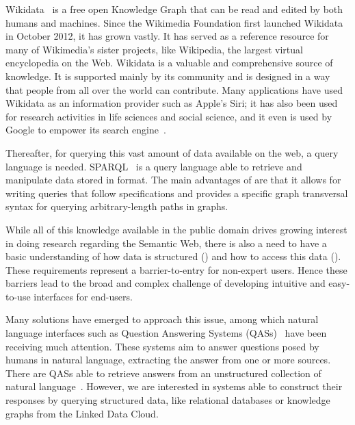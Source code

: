 Wikidata~\cite{KG:wikidata} is a free open Knowledge Graph that can be read and edited by both humans 
and machines. Since the Wikimedia Foundation first launched Wikidata in October 2012, it has grown 
vastly. It has served as a reference resource for many of Wikimedia’s sister 
projects, like Wikipedia, the largest virtual encyclopedia on the Web. Wikidata is a valuable 
and comprehensive source of knowledge. It is supported mainly by its community and is 
designed in a way that people from all over the world can contribute. Many applications have 
used Wikidata as an information provider such as Apple’s Siri; it has also been used for research 
activities in life sciences and social science, and it even is used by Google to empower its search 
engine~\cite{wikidata:usage-MalyshevKGGB18}.

Thereafter, for querying this vast amount of data available on the web, a query language is needed. 
SPARQL~\cite{key:sparql11} is a query language able to retrieve and manipulate data stored in \RDF{} 
format. The main advantages of \SPARQL{} are that it allows for writing queries that follow \RDF{} 
specifications and provides a specific graph transversal syntax for querying arbitrary-length paths 
in graphs.

While all of this knowledge available in the public domain drives growing interest in doing 
research regarding the Semantic Web, there is also a need to have a basic understanding of 
how data is structured (\RDF) and how to access this data (\SPARQL). These requirements 
represent a barrier-to-entry for non-expert users. Hence these barriers lead to the broad and 
complex challenge of developing intuitive and easy-to-use interfaces for end-users.

Many solutions have emerged to approach this issue, among which natural language interfaces such as 
Question Answering Systems (QASs)~\cite{qa:survey-BOUZIANE2015366, qa:intro-UngerFC14, 
qa:nn-qakg-Chakraborty19} have been receiving much attention. These systems aim to answer questions 
posed by humans in natural language, extracting the answer from one or more sources. There are QASs 
able to retrieve answers from an unstructured collection of natural language~\cite{qa:survey-BOUZIANE2015366}. 
However, we are interested in systems able to construct their responses by querying structured data, 
like relational databases or knowledge graphs from the Linked Data Cloud.

